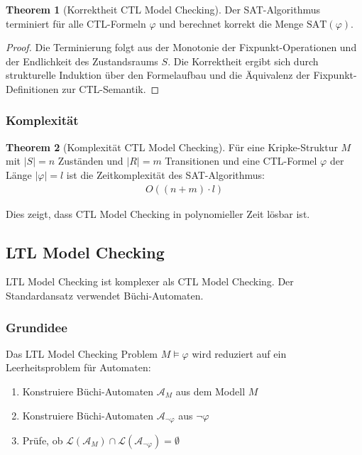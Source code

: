 ﻿\documentclass[a4paper,12pt]{article}
\theoremstyle{definition}
\newtheorem{theorem}{Theorem}[section]
\begin{document}
\begin{theorem}[Korrektheit CTL Model Checking]
	Der SAT-Algorithmus terminiert für alle CTL-Formeln $\varphi$ und berechnet korrekt die Menge $\text{SAT}(\varphi)$.
\end{theorem}

\begin{proof}
	Die Terminierung folgt aus der Monotonie der Fixpunkt-Operationen und der Endlichkeit des Zustandsraums $S$. Die Korrektheit ergibt sich durch strukturelle Induktion über den Formelaufbau und die Äquivalenz der Fixpunkt-Definitionen zur CTL-Semantik.
\end{proof}

\subsubsection{Komplexität}

\begin{theorem}[Komplexität CTL Model Checking]
	Für eine Kripke-Struktur $M$ mit $|S| = n$ Zuständen und $|R| = m$ Transitionen und eine CTL-Formel $\varphi$ der Länge $|\varphi| = l$ ist die Zeitkomplexität des SAT-Algorithmus:
	\begin{align}
	O((n + m) \cdot l)
	\end{align}
\end{theorem}

Dies zeigt, dass CTL Model Checking in polynomieller Zeit lösbar ist.

\subsection{LTL Model Checking}

LTL Model Checking ist komplexer als CTL Model Checking. Der Standardansatz verwendet Büchi-Automaten.

\subsubsection{Grundidee}

Das LTL Model Checking Problem $M \models \varphi$ wird reduziert auf ein Leerheitsproblem für Automaten:
\begin{enumerate}
	\item Konstruiere Büchi-Automaten $\mathcal{A}_M$ aus dem Modell $M$
	\item Konstruiere Büchi-Automaten $\mathcal{A}_{\neg\varphi}$ aus $\neg\varphi$
	\item Prüfe, ob $\mathcal{L}(\mathcal{A}_M) \cap \mathcal{L}(\mathcal{A}_{\neg\varphi}) = \emptyset$
\end{enumerate}
\end{document}

